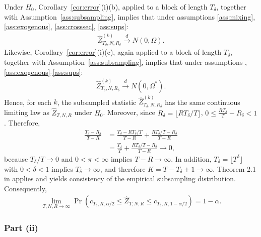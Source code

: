Under $H_0$, Corollary~\ref{cor:error}(i)(b), applied to a block of length
$T_\delta$, together with Assumption~\ref{ass:subsampling}, implies that under
assumptions \ref{ass:mixing}, \ref{ass:exogenous}, \ref{ass:crosssec},
\ref{ass:sups}:
\begin{align*}
\widehat{Z}_{T_\delta,N,R_\delta}^{(k)} \overset{d}{\rightarrow} N(0,\Omega).
\end{align*}
Likewise, Corollary~\ref{cor:error}(i)(c), again applied to a block of length
$T_\delta$, together with Assumption~\ref{ass:subsampling}, implies that under
assumptions ,
\ref{ass:exogenous}-\ref{ass:sups}:
\begin{align*}
\widehat{Z}_{T_\delta,N,R_\delta}^{(k)} \overset{d}{\rightarrow} N(0,\Omega^{\ast}).
\end{align*}
Hence, for each $k$, the subsampled statistic
$\widehat{Z}_{T_\delta,N,R_\delta}^{(k)}$ has the same continuous limiting
law as $\widehat{Z}_{T,N,R}$ under $H_0$. Moreover, since $R_\delta=\lfloor RT_\delta/T\rfloor$, $0\leq \frac{RT_\delta}{T}-R_\delta < 1$. Therefore,
\begin{align*}
\frac{T_\delta-R_\delta}{T-R}
&= \frac{T_\delta-RT_\delta/T}{T-R}
+ \frac{RT_\delta/T-R_\delta}{T-R} \\
&= \frac{T_\delta}{T}
+ \frac{RT_\delta/T-R_\delta}{T-R}
\longrightarrow 0,
\end{align*}
because $T_\delta/T\to 0$ and $0<\pi<\infty$ implies $T-R\to\infty$. In
addition, $T_\delta=\lfloor T^\delta\rfloor$ with $0<\delta<1$ implies
$T_\delta\to\infty$, and therefore $K=T-T_\delta+1\to\infty$.
Theorem 2.1 in \cite{politis1997subsampling} applies and yields
consistency of the empirical subsampling distribution. Consequently,
\begin{align*}
\lim_{T,N,R\rightarrow \infty }
\Pr \left( c_{T_\delta,K,\alpha/2}\leq \widehat{Z}_{T,N,R}\leq c_{T_\delta,K,1-\alpha/2}\right)
=1-\alpha.
\end{align*}

\subsubsection{Part (ii)}

